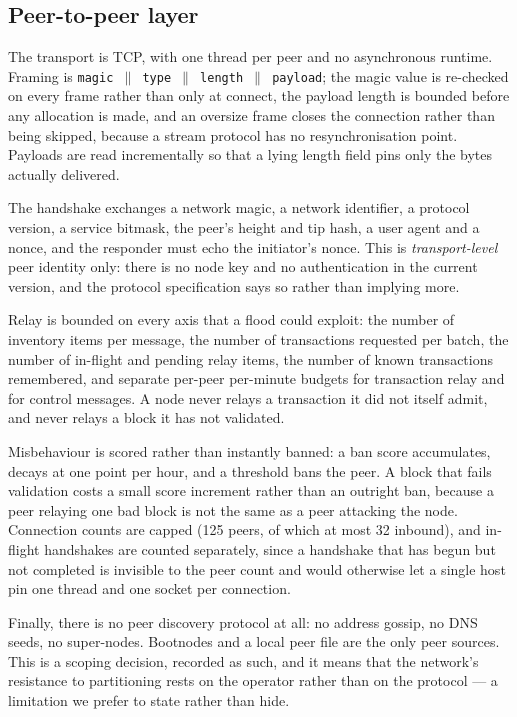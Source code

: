 \documentclass{article}
\begin{document}
\subsection{Peer-to-peer layer}

The transport is TCP, with one thread per peer and no asynchronous runtime.
Framing is \texttt{magic $\parallel$ type $\parallel$ length $\parallel$
payload}; the magic value is re-checked on every frame rather than only at
connect, the payload length is bounded before any allocation is made, and an
oversize frame closes the connection rather than being skipped, because a
stream protocol has no resynchronisation point. Payloads are read incrementally
so that a lying length field pins only the bytes actually delivered.

The handshake exchanges a network magic, a network identifier, a protocol
version, a service bitmask, the peer's height and tip hash, a user agent and a
nonce, and the responder must echo the initiator's nonce. This is
\emph{transport-level} peer identity only: there is no node key and no
authentication in the current version, and the protocol specification says so
rather than implying more.

Relay is bounded on every axis that a flood could exploit: the number of
inventory items per message, the number of transactions requested per batch,
the number of in-flight and pending relay items, the number of known
transactions remembered, and separate per-peer per-minute budgets for
transaction relay and for control messages. A node never relays a transaction
it did not itself admit, and never relays a block it has not validated.

Misbehaviour is scored rather than instantly banned: a ban score accumulates,
decays at one point per hour, and a threshold bans the peer. A block that fails
validation costs a small score increment rather than an outright ban, because
a peer relaying one bad block is not the same as a peer attacking the node.
Connection counts are capped (125 peers, of which at most 32 inbound), and
in-flight handshakes are counted separately, since a handshake that has begun
but not completed is invisible to the peer count and would otherwise let a
single host pin one thread and one socket per connection.

Finally, there is no peer discovery protocol at all: no address gossip, no
DNS seeds, no super-nodes. Bootnodes and a local peer file are the only peer
sources. This is a scoping decision, recorded as such, and it means that the
network's resistance to partitioning rests on the operator rather than on the
protocol --- a limitation we prefer to state rather than hide.
\end{document}

